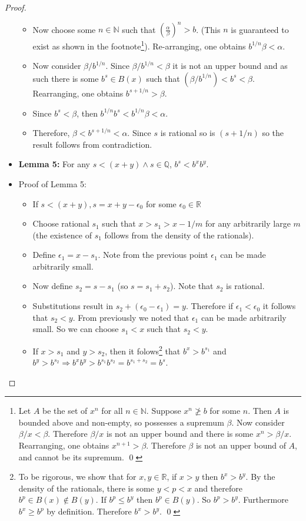 \documentclass[12pt]{article}
\newcommand{\R}{\mathbb{R}}
\newcommand{\Q}{\mathbb{Q}}
\newcommand{\N}{\mathbb{N}}
\begin{document}
\begin{proof}
\begin{itemize}
\begin{itemize}
                \item Now choose some $n \in \N$ such that $(\frac{\alpha}{\beta})^n > b$. (This $n$ is guaranteed to exist as shown in the footnote\footnote{Let $A$ be the set of $x^n$ for all $n \in \N$. Suppose $x^n \ngeq b$ for some $n$. Then $A$ is bounded above and non-empty, so possesses a supremum $\beta$. Now consider $\beta/x < \beta$. Therefore $\beta/x$ is not an upper bound and there is some $x^n > \beta/x$. Rearranging, one obtains $x^{n+1} > \beta$. Therefore $\beta$ is not an upper bound of $A$, and cannot be its supremum. \qed}). Re-arranging, one obtains $b^{1/n} \beta < \alpha$.
                \item Now consider $\beta/b^{1/n}$. Since $\beta/b^{1/n} < \beta$ it is not an upper bound and as such there is some $b^s \in B(x)$ such that $(\beta/b^{1/n}) < b^s < \beta$. Rearranging, one obtains $b^{s+1/n} > \beta$.
                \item Since $b^s < \beta$, then $b^{1/n} b^s  < b^{1/n} \beta < \alpha$.
                \item Therefore, $\beta < b^{s+1/n} < \alpha$. Since $s$ is rational so is $(s+1/n)$ so the result follows from contradiction.
            \end{itemize}
    \item \textbf{Lemma 5:} For any $s < (x+y) \land s \in \Q$, $b^s < b^x b^y$.
        \item Proof of Lemma 5:
            \begin{itemize}
                \item If $s < (x+y), s = x+y-\epsilon_0$ for some $\epsilon_0 \in \R$
                \item Choose rational $s_1$ such that $x > s_1 > x - 1/m$ for any arbitrarily large $m$ (the existence of $s_1$ follows from the density of the rationals).
                \item Define $\epsilon_1 = x - s_1$. Note from the previous point $\epsilon_1$ can be made arbitrarily small.
                \item Now define $s_2 = s - s_1$ (so $s = s_1 + s_2$). Note that $s_2$ is rational.
                \item Substitutions result in $s_2 + (\epsilon_0 - \epsilon_1) = y$. Therefore if $\epsilon_1 < \epsilon_0$ it follows that $s_2 < y$. From previously we noted that $\epsilon_1$ can be made arbitrarily small. So we can choose $s_1 < x$ such that $s_2 < y$.
                \item If $x > s_1$ and $y > s_2$, then it folows\footnote{To be rigorous, we show that for $x, y \in \R$, if $x>y$ then $b^x > b^y$. By the density of the rationals, there is some $y < p < x$ and therefore $b^p \in B(x) \not\in B(y)$. If $b^p \leq b^y$ then $b^p \in B(y)$. So $b^p > b^y$. Furthermore $b^x \geq b^p$ by definition. Therefore $b^x > b^y$. \qed} that $b^x > b^{s_1}$ and $b^y > b^{s_2} \Rightarrow b^x b^y > b^{s_1} b^{s_2} = b^{s_1 + s_2} = b^s$.

\end{itemize}
\end{itemize}
\end{proof}
\end{document}
